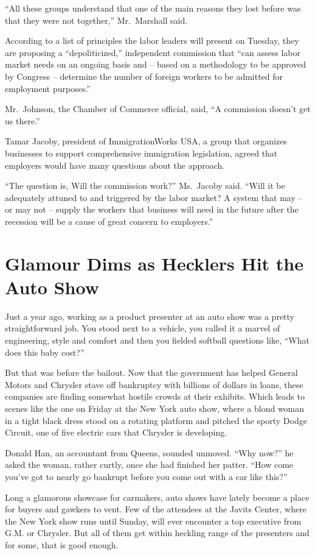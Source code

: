 \documentclass[12pt,a4paper,onecolumn]{article}
\begin{document}
``All these groups understand that one of the main reasons they lost before was that they were not
together,'' Mr.~Marshall said.

According to a list of principles the labor leaders will present on Tuesday, they are proposing a
``depoliticized,'' independent commission that ``can assess labor market needs on an ongoing basis
and -- based on a methodology to be approved by Congress -- determine the number of foreign workers
to be admitted for employment purposes.''

Mr.~Johnson, the Chamber of Commerce official, said, ``A commission doesn't get us there.''

Tamar Jacoby, president of ImmigrationWorks USA, a group that organizes businesses to support
comprehensive immigration legislation, agreed that employers would have many questions about the
approach.

``The question is, Will the commission work?'' Ms.~Jacoby said. ``Will it be adequately attuned to
and triggered by the labor market? A system that may -- or may not -- supply the workers that
business will need in the future after the recession will be a cause of great concern to
employers.''

\section{Glamour Dims as Hecklers Hit the Auto Show}

Just a year ago, working as a product presenter at an auto show was a pretty straightforward job.
You stood next to a vehicle, you called it a marvel of engineering, style and comfort and then you
fielded softball questions like, ``What does this baby cost?''

But that was before the bailout. Now that the government has helped General Motors and Chrysler
stave off bankruptcy with billions of dollars in loans, these companies are finding somewhat hostile
crowds at their exhibits. Which leads to scenes like the one on Friday at the New York auto show,
where a blond woman in a tight black dress stood on a rotating platform and pitched the sporty Dodge
Circuit, one of five electric cars that Chrysler is developing.

Donald Han, an accountant from Queens, sounded unmoved. ``Why now?'' he asked the woman, rather
curtly, once she had finished her patter. ``How come you've got to nearly go bankrupt before you
come out with a car like this?''

Long a glamorous showcase for carmakers, auto shows have lately become a place for buyers and
gawkers to vent. Few of the attendees at the Javits Center, where the New York show runs until
Sunday, will ever encounter a top executive from G.M. or Chrysler. But all of them get within
heckling range of the presenters and for some, that is good enough.
\end{document}
